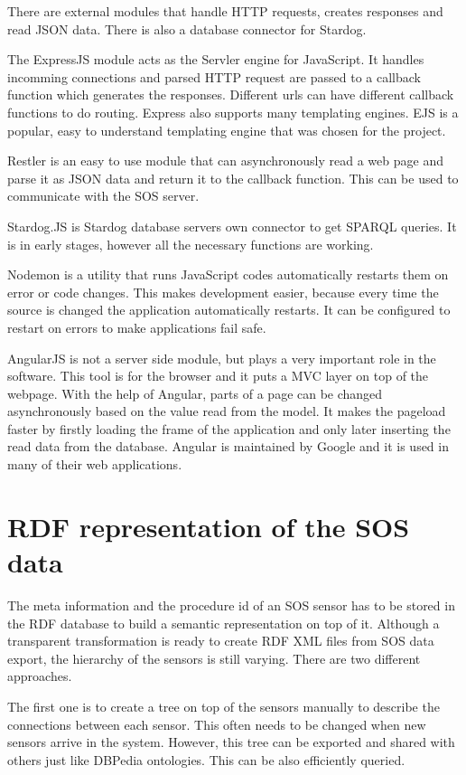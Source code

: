 There are external modules that handle HTTP requests, creates responses and read JSON data. There is also a database connector for Stardog. 

The ExpressJS module acts as the Servler engine for JavaScript. It handles incomming connections and parsed HTTP request are passed to a callback function which generates the responses. Different urls can have different callback functions to do routing. Express also supports many templating engines. EJS is a popular, easy to understand templating engine that was chosen for the project.

Restler is an easy to use module that can asynchronously read a web page and parse it as JSON data and return it to the callback function. This can be used to communicate with the SOS server.

Stardog.JS is Stardog database servers own connector to get SPARQL queries. It is in early stages, however all the necessary functions are working. 

Nodemon is a utility that runs JavaScript codes automatically restarts them on error or code changes. This makes development easier, because every time the source is changed the application automatically restarts. It can be configured to restart on errors to make applications fail safe.

AngularJS is not a server side module, but plays a very important role in the software. This tool is for the browser and it puts a MVC layer on top of the webpage. With the help of Angular, parts of a page can be changed asynchronously based on the value read from the model. It makes the pageload faster by firstly loading the frame of the application and only later inserting the read data from the database. Angular is maintained by Google and it is used in many of their web applications.

\section{RDF representation of the SOS data}

The meta information and the procedure id of an SOS sensor has to be stored in the RDF database to build a semantic representation on top of it. Although a transparent transformation is ready to create RDF XML files from SOS data export, the hierarchy of the sensors is still varying. There are two different approaches.

The first one is to create a tree on top of the sensors manually to describe the connections between each sensor. This often needs to be changed when new sensors arrive in the system. However, this tree can be exported and shared with others just like DBPedia ontologies. This can be also efficiently queried.

